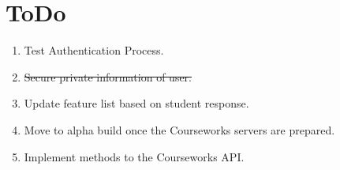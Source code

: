 \documentclass{article}
\begin{document}
\section{ToDo}
\begin{enumerate}
    \item   Test Authentication Process.
    \item   \st{Secure private information of user.}
    \item   Update feature list based on student response.
    \item   Move to alpha build once the Courseworks servers are prepared.
    \item   Implement methods to the Courseworks API.
\end{enumerate}
\end{document}
